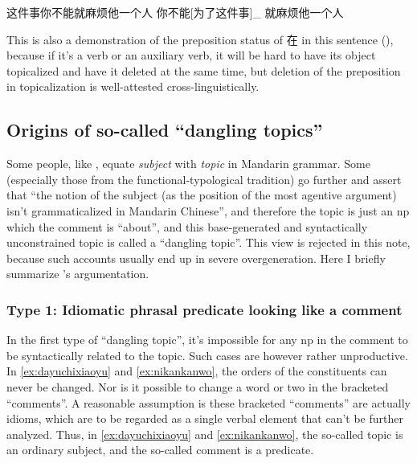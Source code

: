 \documentclass[UTF8, a4paper, oneside, scheme=plain]{ctexrep}
\newcommand*{\citesec}[1]{\S~{#1}}
\newcommand*{\term}[1]{\emph{#1}}
\begin{document}
\begin{exe}
    \ex\label{ex:zhejianshinibunengjiumafantayigeren} 这件事你不能就麻烦他一个人
    \ex 你不能[为了这件事]_{} 就麻烦他一个人
\end{exe}
This is also a demonstration of the preposition status of 在 in this sentence (),
because if it's a verb or an auxiliary verb,
it will be hard to have its object topicalized and have it deleted at the same time,
but deletion of the preposition in topicalization is well-attested cross-linguistically.

\subsection{Origins of so-called ``dangling topics''}\label{sec:topic-subject}

Some people, like \citet[\citesec{7.1}]{zhudexigrammar},
equate \term{subject} with \term{topic} in Mandarin grammar.
Some (especially those from the functional-typological tradition) go further 
and assert that ``the notion of the subject (as the position of the most agentive argument) 
isn't grammaticalized in Mandarin Chinese'',
and therefore the topic is just an \acs{np} which the comment is ``about'',
and this base-generated and syntactically unconstrained topic 
is called a ``dangling topic''.
This view is rejected in this note,
because such accounts usually end up in severe overgeneration. 
Here I briefly summarize \citet{sih2000topic}'s argumentation.

\subsubsection{Type 1: Idiomatic phrasal predicate looking like a comment}\label{sec:clause.dangling-topic.1}

In the first type of ``dangling topic'',
it's impossible for any \acs{np} in the comment to be syntactically related to the topic.
Such cases are however rather unproductive. 
In \eqref{ex:dayuchixiaoyu} and \eqref{ex:nikankanwo},
the orders of the constituents can never be changed.
Nor is it possible to change a word or two in the bracketed ``comments''.
A reasonable assumption is these bracketed ``comments''
are actually idioms, 
which are to be regarded as a single verbal element that can't be further analyzed.
Thus, in \eqref{ex:dayuchixiaoyu} and \eqref{ex:nikankanwo},
the so-called topic is an ordinary subject,
and the so-called comment is a predicate.
\end{document}
